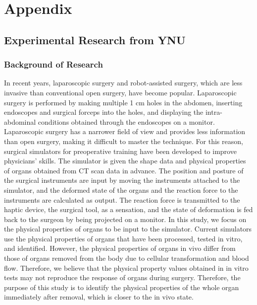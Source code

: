\appendix %



\chapter{Appendix} %
\label{AppendixA} %

\section{Experimental Research from YNU}

\subsection*{Background of Research}
In recent years, laparoscopic surgery and robot-assisted surgery, which are less invasive than conventional open surgery, have become popular. Laparoscopic surgery is performed by making multiple 1 cm holes in the abdomen, inserting endoscopes and surgical forceps into the holes, and displaying the intra-abdominal conditions obtained through the endoscopes on a monitor. Laparoscopic surgery has a narrower field of view and provides less information than open surgery, making it difficult to master the technique. For this reason, surgical simulators for preoperative training have been developed to improve physicians' skills. The simulator is given the shape data and physical properties of organs obtained from CT scan data in advance. The position and posture of the surgical instruments are input by moving the instruments attached to the simulator, and the deformed state of the organs and the reaction force to the instruments are calculated as output. The reaction force is transmitted to the haptic device, the surgical tool, as a sensation, and the state of deformation is fed back to the surgeon by being projected on a monitor. In this study, we focus on the physical properties of organs to be input to the simulator. Current simulators use the physical properties of organs that have been processed, tested in vitro, and identified. However, the physical properties of organs in vivo differ from those of organs removed from the body due to cellular transformation and blood flow. Therefore, we believe that the physical property values obtained in in vitro tests may not reproduce the response of organs during surgery. Therefore, the purpose of this study is to identify the physical properties of the whole organ immediately after removal, which is closer to the in vivo state.

